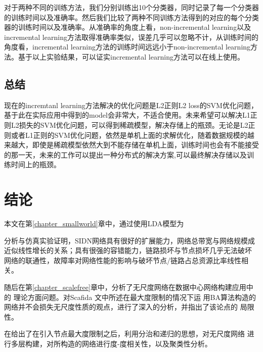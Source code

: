 \documentclass[master]{njuthesis}
\begin{document}
    对于两种不同的训练方法，我们分别训练出10个分类器，同时记录了每一个分类器的训练时间以及准确率。然后我们比较了两种不同训练方法得到的对应的每个分类器的训练时间以及准确率。从准确率的角度上看，non-incremental learning以及incremental learning方法取得准确率类似，误差几乎可以忽略不计，从训练时间的角度看，incremental learning方法的训练时间远远小于non-incremental learning方法。基于以上实验结果，可以证实incremental learning方法可以在线上使用。

\section{总结}

    现在的incremtanl learning方法解决的优化问题是L2正则L2 loss的SVM优化问题，基于此在实际应用中得到的model会非常大，不适合使用。未来希望可以解决L1正则L2损失的SVM优化问题，可以得到稀疏模型，解决存储上的瓶颈。无论是L2正则或者L1正则的SVM优化问题，依然是单机上面的求解优化，随着数据规模的越来越大，即使是稀疏模型依然大到不能存储在单机上面，训练时间也会有不能接受的那一天，未来的工作可以提出一种分布式的解决方案,可以最终解决存储以及训练时间上的瓶颈。

\chapter{结论}\label{chapter_concludes}

本文在第\ref{chapter_smallworld}章中，通过使用LDA模型为

分析与仿真实验证明，SIDN网络具有很好的扩展能力，网络总带宽与网络规模成
近似线性增长的关系；具有很强的容错能力，链路损坏与节点损坏几乎无法破坏
网络的联通性，故障率对网络性能的影响与破坏节点/链路占总资源比率线性相关。

随后在第\ref{chapter_scalefree}章中，分析了无尺度网络在数据中心网络构建应用中的
理论方面问题。对Scafida \cite{gyarmati2010scafida}文中所述在最大度限制的情况下运
用BA算法构造的网络并不会损失无尺度性质的观点，进行了深入的分析，并指出了该论点的
局限性。

在给出了在引入节点最大度限制之后，利用分治和递归的思想，对无尺度网络
进行多层构建，对所构造的网络进行度-度相关性，以及聚类性分析。
\end{document}
